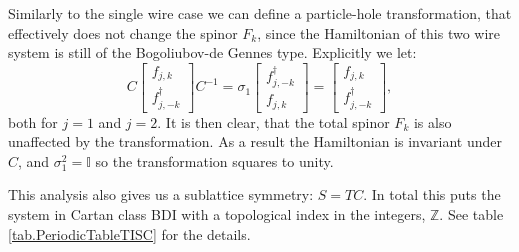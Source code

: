 Similarly to the single wire case we can define a particle-hole transformation, that effectively does not change the spinor $F_k$, since the Hamiltonian of this two wire system is still of the Bogoliubov-de Gennes type. Explicitly we let:
\begin{equation}
C\begin{bmatrix} f_{j,k} \\ f^\dagger_{j,-k} \end{bmatrix}C^{-1} = \sigma_1 \begin{bmatrix} f^\dagger_{j,-k} \\ f_{j,k} \end{bmatrix} = \begin{bmatrix} f_{j,k} \\ f^\dagger_{j,-k} \end{bmatrix}, 
\end{equation} 
both for $j=1$ and $j=2$. It is then clear, that the total spinor $F_k$ is also unaffected by the transformation. As a result the Hamiltonian is invariant under $C$, and $\sigma_1^2 = \mathbb{I}$ so the transformation squares to unity. 

This analysis also gives us a sublattice symmetry: $S = TC$. In total this puts the system in Cartan class BDI with a topological index in the integers, $\mathbb{Z}$. See table \ref{tab.PeriodicTableTISC} for the details. 


